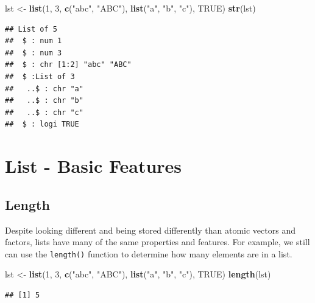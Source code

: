 \documentclass[
]{book}
\newenvironment{Shaded}{\begin{snugshade}}{\end{snugshade}}
\newcommand{\DecValTok}[1]{\textcolor[rgb]{0.00,0.00,0.81}{#1}}
\newcommand{\KeywordTok}[1]{\textcolor[rgb]{0.13,0.29,0.53}{\textbf{#1}}}
\newcommand{\NormalTok}[1]{#1}
\newcommand{\OtherTok}[1]{\textcolor[rgb]{0.56,0.35,0.01}{#1}}
\newcommand{\StringTok}[1]{\textcolor[rgb]{0.31,0.60,0.02}{#1}}
\begin{document}
\begin{Shaded}
\begin{Highlighting}[]
\NormalTok{lst <-}\StringTok{ }\KeywordTok{list}\NormalTok{(}\DecValTok{1}\NormalTok{, }\DecValTok{3}\NormalTok{, }\KeywordTok{c}\NormalTok{(}\StringTok{"abc"}\NormalTok{, }\StringTok{"ABC"}\NormalTok{), }\KeywordTok{list}\NormalTok{(}\StringTok{"a"}\NormalTok{, }\StringTok{"b"}\NormalTok{, }\StringTok{"c"}\NormalTok{), }\OtherTok{TRUE}\NormalTok{)}
\KeywordTok{str}\NormalTok{(lst)}
\end{Highlighting}
\end{Shaded}

\begin{verbatim}
## List of 5
##  $ : num 1
##  $ : num 3
##  $ : chr [1:2] "abc" "ABC"
##  $ :List of 3
##   ..$ : chr "a"
##   ..$ : chr "b"
##   ..$ : chr "c"
##  $ : logi TRUE
\end{verbatim}

\hypertarget{list---basic-features}{%
\section{List - Basic Features}\label{list---basic-features}}

\hypertarget{length-2}{%
\subsection{Length}\label{length-2}}

Despite looking different and being stored differently than atomic vectors and factors, lists have many of the same properties and features. For example, we still can use the \texttt{length()} function to determine how many elements are in a list.

\begin{Shaded}
\begin{Highlighting}[]
\NormalTok{lst <-}\StringTok{ }\KeywordTok{list}\NormalTok{(}\DecValTok{1}\NormalTok{, }\DecValTok{3}\NormalTok{, }\KeywordTok{c}\NormalTok{(}\StringTok{"abc"}\NormalTok{, }\StringTok{"ABC"}\NormalTok{), }\KeywordTok{list}\NormalTok{(}\StringTok{"a"}\NormalTok{, }\StringTok{"b"}\NormalTok{, }\StringTok{"c"}\NormalTok{), }\OtherTok{TRUE}\NormalTok{)}
\KeywordTok{length}\NormalTok{(lst)}
\end{Highlighting}
\end{Shaded}

\begin{verbatim}
## [1] 5
\end{verbatim}
\end{document}
